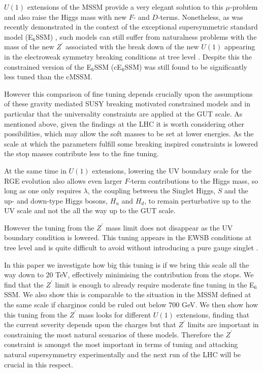 \documentclass[preprint,amsmath,amssymb,aps,superscriptaddress,prd,showpacs,floatfix,nofootinbib]{revtex4-1}
\begin{document}
$U(1)$ extensions of the MSSM provide a very elegant solution to this
$\mu$-problem \cite{Fayet:1977yc, Kim:1983dt, Suematsu:1994qm,
  Cvetic:1995rj, Cvetic:1996mf, Jain:1995cb, Nir:1995bu,
  Cvetic:1997ky} and also raise the Higgs mass with new $F$- and
$D$-terms. Nonetheless, as was recently demonstrated in the context of
the exceptional supersymmetric standard model (E$_6$SSM)
\cite{King:2005jy,King:2005my,Athron:2010zz}, such models can still
suffer from naturalness problems with the mass of the new $Z^\prime$
associated with the break down of the new $U(1)$ appearing in the
electroweak symmetry breaking conditions at tree level
\cite{Athron:2013ipa}. Despite this the constrained version of
the E$_6$SSM (cE$_6$SSM) \cite{Athron:2009ue, Athron:2009bs} was still found
to be significantly less tuned than the cMSSM.

However this comparison of fine tuning depends crucially upon the
assumptions of these gravity mediated SUSY breaking motivated
constrained models and in particular that the universality
constraints are applied at the GUT scale.  As mentioned above, given
the findings at the LHC it is worth considering other possibilities,
which may allow the soft masses to be set at lower energies. As the
scale at which the parameters fulfill some breaking inspired
constraints is lowered the stop masses contribute less to the fine
tuning.

At the same time in $U(1)$ extensions, lowering the UV boundary scale
for the RGE evolution also allows even larger $F$-term contributions
to the Higgs mass, so long as one only requires $\lambda$, the
coupling between the Singlet Higgs, $S$ and the up- and down-type
Higgs bosons, $H_u$ and $H_d$, to remain perturbative up to the UV
scale and not the all the way up to the GUT scale.

However the tuning from the $Z^\prime$ mass limit does not disappear
as the UV boundary condition is lowered. This tuning appears in the
EWSB conditions at tree level and is quite difficult to avoid without
introducing a pure gauge singlet \cite{Athron:2014pua}.



In this paper we investigate how big this tuning is if we bring this
scale all the way down to 20 TeV, effectively minimising the contribution
from the stops. We find that the $Z^\prime$ limit is enough to already
require moderate fine tuning in the E$_6$SSM.  We also show this is
comparable to the situation in the MSSM defined at the same scale if
charginos could be ruled out below $700$ GeV.  We then show how this
tuning from the $Z^\prime$ mass looks for different $U(1)$ extensions,
finding that the current severity depends upon the charges but that
$Z^\prime$ limits are important in constraining the most natural
scenarios of these models.  Therefore the $Z^\prime$ constraint
is amongst the most important in terms of tuning and attacking natural
supersymmetry experimentally and the next run of the LHC will be
crucial in this respect.
\end{document}
